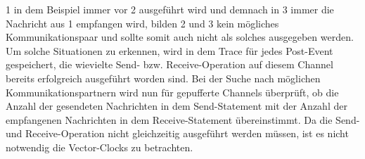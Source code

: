 1 in dem Beispiel immer vor 2 ausgeführt wird und demnach in 3 immer die 
Nachricht aus 1 empfangen wird, bilden 2 und 3 kein mögliches Kommunikationspaar
und sollte somit auch nicht als solches ausgegeben werden. Um solche Situationen 
zu erkennen, wird in dem Trace für jedes Post-Event gespeichert, die 
wievielte Send- bzw. Receive-Operation auf diesem Channel bereits erfolgreich 
ausgeführt worden sind. Bei der Suche nach möglichen Kommunikationspartnern 
wird nun für gepufferte Channels überprüft, ob die Anzahl der gesendeten 
Nachrichten in dem Send-Statement mit der Anzahl der empfangenen 
Nachrichten in dem Receive-Statement übereinstimmt. Da die 
Send- und Receive-Operation nicht gleichzeitig ausgeführt werden müssen, 
ist es nicht notwendig die Vector-Clocks zu betrachten.


